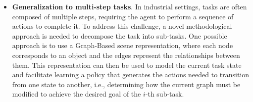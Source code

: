 {\begin{itemize}
    \item \textbf{Generalization to multi-step tasks}. In industrial settings, tasks are often composed of multiple steps, requiring the agent to perform a sequence of actions to complete it. To address this challenge, a novel methodological approach is needed to decompose the task into sub-tasks. One possible approach is to use a Graph-Based scene representation, where each node corresponds to an object and the edges represent the relationships between them. This representation can then be used to model the current task state and facilitate learning a policy that generates the actions needed to transition from one state to another, i.e., determining how the current graph must be modified to achieve the desired goal of the $i$-th sub-task. 
\end{itemize}
}




